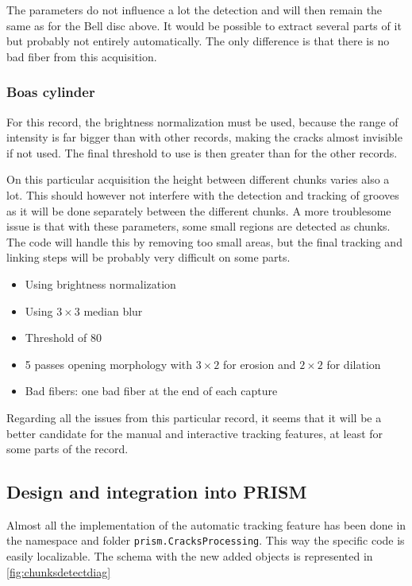 The parameters do not influence a lot the detection and will then remain the same as for the Bell disc above. It would be possible to extract several parts of it but probably not entirely automatically. The only difference is that there is no bad fiber from this acquisition.

\subsubsection{Boas cylinder}

For this record, the brightness normalization must be used, because the range of intensity is far bigger than with other records, making the cracks almost invisible if not used. The final threshold to use is then greater than for the other records.

On this particular acquisition the height between different chunks varies also a lot. This should however not interfere with the detection and tracking of grooves as it will be done separately between the different chunks. A more troublesome issue is that with these parameters, some small regions are detected as chunks. The code will handle this by removing too small areas, but the final tracking and linking steps will be probably very difficult on some parts.

\begin{itemize}
\item Using brightness normalization
\item Using $3 \times 3$ median blur
\item Threshold of 80
\item 5 passes opening morphology with $3 \times 2$ for erosion and $2 \times 2$ for dilation
\item Bad fibers: one bad fiber at the end of each capture
\end{itemize}

Regarding all the issues from this particular record, it seems that it will be a better candidate for the manual and interactive tracking features, at least for some parts of the record.

\subsection{Design and integration into PRISM}

Almost all the implementation of the automatic tracking feature has been done in the namespace and folder \texttt{prism.CracksProcessing}. This way the specific code is easily localizable. The schema with the new added objects is represented in \autoref{fig:chunksdetectdiag}

